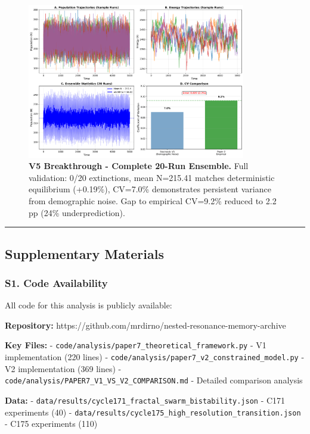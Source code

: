 \documentclass[
]{article}
\begin{document}
\begin{figure}[htbp]
\centering
\includegraphics[width=0.85\textwidth]{figures/paper7_fig18_v5_breakthrough.png}
\caption{\textbf{V5 Breakthrough - Complete 20-Run Ensemble.} Full validation: 0/20 extinctions, mean N=215.41 matches deterministic equilibrium (+0.19\%), CV=7.0\% demonstrates persistent variance from demographic noise. Gap to empirical CV=9.2\% reduced to 2.2 pp (24\% underprediction).}
\label{fig:v5-breakthrough}
\end{figure}

\begin{center}\rule{0.5\linewidth}{0.5pt}\end{center}

\subsection{Supplementary Materials}\label{supplementary-materials}

\subsubsection{S1. Code Availability}\label{s1.-code-availability}

All code for this analysis is publicly available:

\textbf{Repository:}
https://github.com/mrdirno/nested-resonance-memory-archive

\textbf{Key Files:} -
\texttt{code/analysis/paper7\_theoretical\_framework.py} - V1
implementation (220 lines) -
\texttt{code/analysis/paper7\_v2\_constrained\_model.py} - V2
implementation (369 lines) -
\texttt{code/analysis/PAPER7\_V1\_VS\_V2\_COMPARISON.md} - Detailed
comparison analysis

\textbf{Data:} -
\texttt{data/results/cycle171\_fractal\_swarm\_bistability.json} - C171
experiments (40) -
\texttt{data/results/cycle175\_high\_resolution\_transition.json} - C175
experiments (110)
\end{document}

